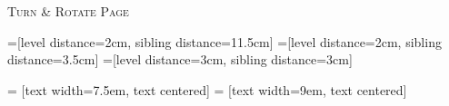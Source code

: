 \documentclass[11pt, english]{article}
\begin{document}
	\vspace{\fill}

	\begin{center}
		\textsc{Turn \& Rotate Page}
	\end{center}

\begin{landscape}

	\begin{center}

        =[level distance=2cm, sibling distance=11.5cm]
        =[level distance=2cm, sibling distance=3.5cm]
        =[level distance=3cm, sibling distance=3cm]

         = [text width=7.5em, text centered]
         = [text width=9em, text centered]


\end{center}
\end{landscape}
\end{document}
